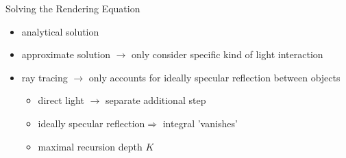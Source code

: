 \begin{frame}{Solving the Rendering Equation}
\begin{itemize}
\item analytical solution 
\pause
\item approximate solution $\rightarrow$ only consider specific kind of light interaction
\pause
\item ray tracing $\rightarrow$ only accounts for ideally specular reflection between objects
\begin{itemize}
	\pause
	\item direct light $\rightarrow$ separate additional step
    \pause
    \item  ideally specular reflection$\Rightarrow$ integral 'vanishes'
    \pause
    \item maximal recursion depth $K$
    \pause
\end{itemize}
\end{itemize}
\end{frame}

